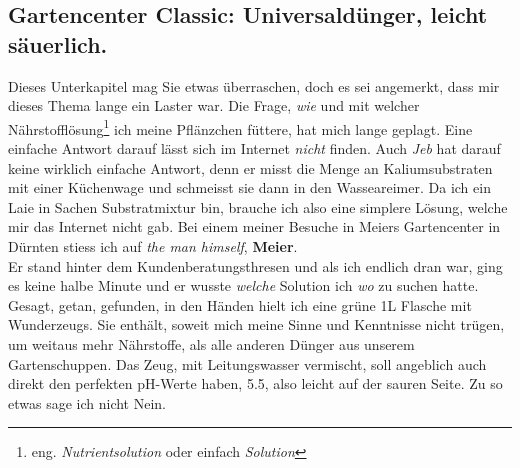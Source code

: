 \documentclass[12pt,titlepage,a4paper]{article}
\begin{document}
\subsection{Gartencenter Classic: Universaldünger, leicht säuerlich.}
Dieses Unterkapitel mag Sie etwas überraschen, doch es sei angemerkt, dass mir dieses Thema lange ein Laster war. Die Frage, \textit{wie} und mit welcher Nährstofflösung\footnote{eng. \textit{Nutrientsolution} oder einfach \textit{Solution}} ich meine Pflänzchen füttere, hat mich lange geplagt. Eine einfache Antwort darauf lässt sich im Internet \textit{nicht} finden. Auch \textit{Jeb} hat darauf keine wirklich einfache Antwort, denn er misst die Menge an Kaliumsubstraten mit einer Küchenwage und schmeisst sie dann in den Wasseareimer. Da ich ein Laie in Sachen Substratmixtur bin, brauche ich also eine simplere Lösung, welche mir das Internet nicht gab. Bei einem meiner Besuche in Meiers Gartencenter in Dürnten stiess ich auf \textit{the man himself}, \textbf{Meier}. \\ Er stand hinter dem Kundenberatungsthresen und als ich endlich dran war, ging es keine halbe Minute und er wusste \textit{welche} Solution ich \textit{wo} zu suchen hatte. Gesagt, getan, gefunden, in den Händen hielt ich eine grüne 1L Flasche mit Wunderzeugs. Sie enthält, soweit mich meine Sinne und Kenntnisse nicht trügen, um weitaus mehr Nährstoffe, als alle anderen Dünger aus unserem Gartenschuppen. Das Zeug, mit Leitungswasser vermischt, soll angeblich auch direkt den perfekten pH-Werte haben, 5.5, also leicht auf der sauren Seite. Zu so etwas sage ich nicht Nein. 
\end{document}
